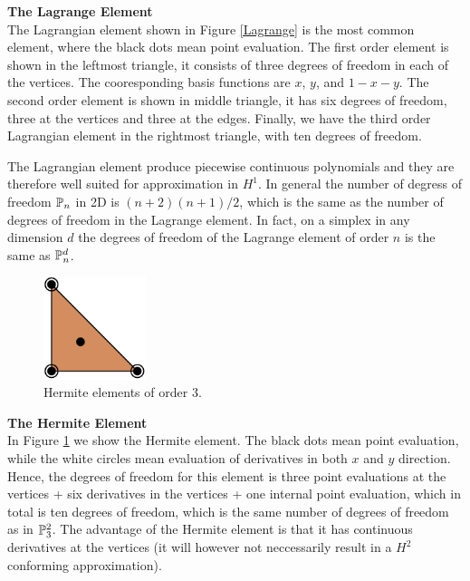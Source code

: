 \begin{example}{\bf{The Lagrange Element}} \\

The Lagrangian element shown in Figure \ref{Lagrange} is the most common element,
where the black dots mean point evaluation.
The first order element is shown in the leftmost triangle, it consists of three
degrees of freedom in each of the vertices. The cooresponding basis functions
are $x$, $y$, and $1-x-y$.  The second order element is shown in middle
triangle, it has six degrees of freedom, three at the vertices and three
at the edges. Finally, we have the third order Lagrangian element in the rightmost
triangle, with ten degrees of freedom.

The Lagrangian element produce piecewise continuous polynomials and they are therefore
well suited for approximation in $H^1$.
In general the number of degress of freedom $\P_n$ in 2D
is $(n+2)(n+1)/2$, which is the same as the number of degrees of freedom in the
Lagrange element. In fact, on a simplex in any dimension $d$ the degrees of freedom
of the Lagrange element of order $n$ is the same as $\P_n^d$.

\end{example}

\begin{figure}
  \begin{center}
    \includegraphics[height=3cm]{chapters/kirby-6/pdf/HER3.pdf}
    \caption{Hermite elements of order 3.}
    \label{Hermite}
  \end{center}
\end{figure}

\begin{example}{\bf{ The Hermite Element}} \\

In Figure \ref{Hermite} we show the Hermite element. The black dots mean point
evaluation, while the white circles mean evaluation of derivatives in both $x$ and
$y$ direction. Hence, the degrees of freedom for this element is three point evaluations
at the vertices +  six derivatives in the vertices + one internal point
evaluation, which in total is ten degrees of freedom, which is the same number
of degrees of freedom as in $\P^2_3$.  The advantage of the Hermite element
is that it has continuous derivatives at the vertices (it will however
not neccessarily result in a $H^2$ conforming approximation).
\end{example}

